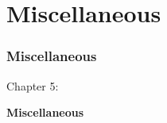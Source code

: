%

\section{Miscellaneous}
\begin{frame}[fragile]
	\frametitle{Miscellaneous}

	\begin{center}\huge{Chapter 5:}\end{center}
	\begin{center}\huge{\color{typo3darkgrey}\textbf{Miscellaneous}}\end{center}

\end{frame}

